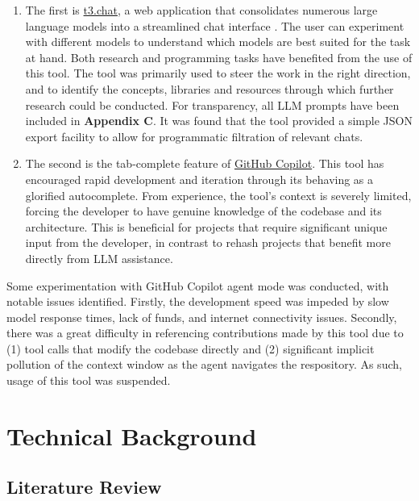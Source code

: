 \documentclass[12pt,a4paper,twoside]{report}
\begin{document}
\begin{enumerate}

\item The first is \href{https://t3.chat}{t3.chat}, a web application that consolidates numerous large language models into a streamlined chat interface \cite{t3chat}. The user can experiment with different models to understand which models are best suited for the task at hand.
Both research and programming tasks have benefited from the use of this tool.
The tool was primarily used to steer the work in the right direction, and to identify the concepts, libraries and resources through which further research could be conducted. For transparency, all LLM prompts have been included in \textbf{Appendix C}. It was found that the tool provided a simple JSON export facility to allow for programmatic filtration of relevant chats.

\item The second is the tab-complete feature of \href{https://github.com/features/copilot}{GitHub Copilot}. This tool has encouraged rapid development and iteration through its behaving as a glorified autocomplete. From experience, the tool's context is severely limited, forcing the developer to have genuine knowledge of the codebase and its architecture. This is beneficial for projects that require significant unique input from the developer, in contrast to rehash projects that benefit more directly from LLM assistance.

\end{enumerate}

Some experimentation with GitHub Copilot agent mode was conducted, with notable issues identified. Firstly, the development speed was impeded by slow model response times, lack of funds, and internet connectivity issues. Secondly, there was a great difficulty in referencing contributions made by this tool due to (1) tool calls that modify the codebase directly and (2) significant implicit pollution of the context window as the agent navigates the respository. As such, usage of this tool was suspended.

\chapter{Technical Background}

\section{Literature Review}
\end{document}
